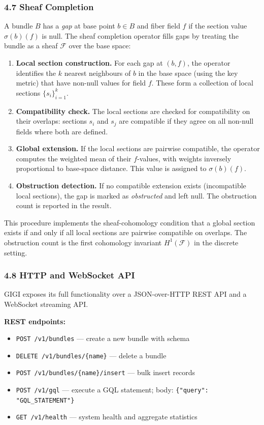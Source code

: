 \documentclass[11pt,letterpaper]{article}
\begin{document}
\subsubsection*{4.7 Sheaf Completion}

A bundle $B$ has a \emph{gap} at base point $b \in B$ and fiber field $f$ if the section value $\sigma(b)(f)$ is null. The sheaf completion operator fills gaps by treating the bundle as a sheaf $\mathcal{F}$ over the base space:
\begin{enumerate}[nosep]
  \item \textbf{Local section construction.} For each gap at $(b, f)$, the operator identifies the $k$ nearest neighbours of $b$ in the base space (using the key metric) that have non-null values for field $f$. These form a collection of local sections $\{s_i\}_{i=1}^k$.
  \item \textbf{Compatibility check.} The local sections are checked for compatibility on their overlaps: sections $s_i$ and $s_j$ are compatible if they agree on all non-null fields where both are defined.
  \item \textbf{Global extension.} If the local sections are pairwise compatible, the operator computes the weighted mean of their $f$-values, with weights inversely proportional to base-space distance. This value is assigned to $\sigma(b)(f)$.
  \item \textbf{Obstruction detection.} If no compatible extension exists (incompatible local sections), the gap is marked as \emph{obstructed} and left null. The obstruction count is reported in the result.
\end{enumerate}
This procedure implements the sheaf-cohomology condition that a global section exists if and only if all local sections are pairwise compatible on overlaps. The obstruction count is the first cohomology invariant $H^1(\mathcal{F})$ in the discrete setting.


\subsubsection*{4.8 HTTP and WebSocket API}

GIGI exposes its full functionality over a JSON-over-HTTP REST API and a WebSocket streaming API.

\textbf{REST endpoints:}
\begin{itemize}[nosep]
  \item \texttt{POST /v1/bundles} --- create a new bundle with schema
  \item \texttt{DELETE /v1/bundles/\{name\}} --- delete a bundle
  \item \texttt{POST /v1/bundles/\{name\}/insert} --- bulk insert records
  \item \texttt{POST /v1/gql} --- execute a GQL statement; body: \texttt{\{"query": "GQL\_STATEMENT"\}}
  \item \texttt{GET /v1/health} --- system health and aggregate statistics
\end{itemize}
\end{document}

